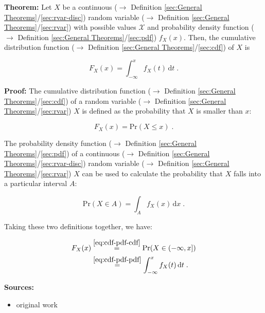 \documentclass[a4paper,12pt,twoside]{book}
\begin{document}
\textbf{Theorem:} Let $X$ be a continuous ($\rightarrow$ Definition \ref{sec:General Theorems}/\ref{sec:rvar-disc}) random variable ($\rightarrow$ Definition \ref{sec:General Theorems}/\ref{sec:rvar}) with possible values $\mathcal{X}$ and probability density function ($\rightarrow$ Definition \ref{sec:General Theorems}/\ref{sec:pdf}) $f_X(x)$. Then, the cumulative distribution function ($\rightarrow$ Definition \ref{sec:General Theorems}/\ref{sec:cdf}) of $X$ is

\begin{equation} \label{eq:cdf-pdf-cdf-pdf}
F_X(x) = \int_{-\infty}^{x} f_X(t) \, \mathrm{d}t \; .
\end{equation}


\vspace{1em}
\textbf{Proof:} The cumulative distribution function ($\rightarrow$ Definition \ref{sec:General Theorems}/\ref{sec:cdf}) of a random variable ($\rightarrow$ Definition \ref{sec:General Theorems}/\ref{sec:rvar}) $X$ is defined as the probability that $X$ is smaller than $x$:

\begin{equation} \label{eq:cdf-pdf-cdf}
F_X(x) = \mathrm{Pr}(X \leq x) \; .
\end{equation}

The probability density function ($\rightarrow$ Definition \ref{sec:General Theorems}/\ref{sec:pdf}) of a continuous ($\rightarrow$ Definition \ref{sec:General Theorems}/\ref{sec:rvar-disc}) random variable ($\rightarrow$ Definition \ref{sec:General Theorems}/\ref{sec:rvar}) $X$ can be used to calculate the probability that $X$ falls into a particular interval $A$:

\begin{equation} \label{eq:cdf-pdf-pdf}
\mathrm{Pr}(X \in A) = \int_{A} f_X(x) \, \mathrm{d}x \; .
\end{equation}

Taking these two definitions together, we have:

\begin{equation} \label{eq:cdf-pdf-cdf-pdf-qed}
\begin{split}
F_X(x) &\overset{\eqref{eq:cdf-pdf-cdf}}{=} \mathrm{Pr}(X \in (-\infty, x]) \\
&\overset{\eqref{eq:cdf-pdf-pdf}}{=} \int_{-\infty}^{x} f_X(t) \, \mathrm{d}t \; .
\end{split}
\end{equation}


\vspace{1em}
\textbf{Sources:}
\begin{itemize}
\item original work\end{itemize}
\end{document}
